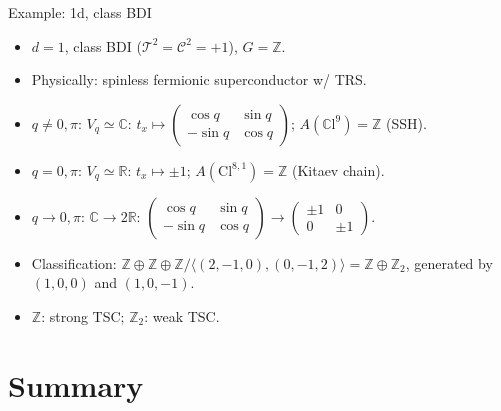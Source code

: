 \documentclass[xcolor=table, 11pt, aspectratio=169]{beamer}
\begin{document}
  \begin{frame}{Example: 1d, class BDI}
    \begin{itemize}
      \item<1-> $d=1$, class BDI ($\mathcal T^2=\mathcal C^2=+1$), $G=\mathbb Z$.
      \item<1-> Physically: spinless fermionic superconductor w/ TRS.
      \item<2-> $q\neq 0,\pi$: $V_q\simeq\mathbb C$: $t_x\mapsto\begin{pmatrix}\cos q & \sin q\\-\sin q & \cos q\end{pmatrix}$; $A(\mathbb C\mathrm l^{9})=\mathbb Z$ (SSH).
      \item<3-> $q=0,\pi$: $V_q\simeq\mathbb R$: $t_x\mapsto\pm1$; $A(\mathrm{Cl}^{8,1})=\mathbb Z$ (Kitaev chain).
      \item<4-> $q\rightarrow 0,\pi$: $\mathbb C\rightarrow2\mathbb R$: $\begin{pmatrix}\cos q & \sin q\\-\sin q & \cos q\end{pmatrix}\rightarrow\begin{pmatrix}\pm1&0\\0&\pm1\end{pmatrix}$.
      \item<5-> Classification: $\mathbb Z\oplus\mathbb Z\oplus\mathbb Z/\langle(2, -1, 0), (0, -1, 2)\rangle=\mathbb Z\oplus\mathbb Z_2$, generated by $(1, 0, 0)$ and $(1, 0, -1)$.
      \item<6-> $\mathbb Z$: strong TSC; $\mathbb Z_2$: weak TSC.
    \end{itemize}
    \begin{center}
    \end{center}
  \end{frame}

  \section{Summary}
\end{document}
